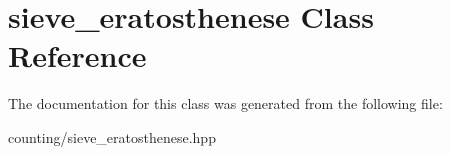 \hypertarget{classsieve__eratosthenese}{}\section{sieve\+\_\+eratosthenese Class Reference}
\label{classsieve__eratosthenese}


The documentation for this class was generated from the following file\+:\begin{DoxyCompactItemize}
\item 
counting/sieve\+\_\+eratosthenese.\+hpp\end{DoxyCompactItemize}
